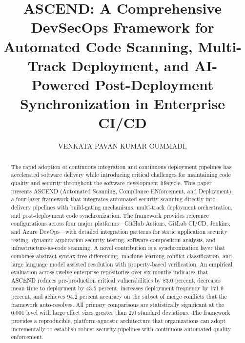 \documentclass{ieeeaccess}
\begin{document}

\title{ASCEND: A Comprehensive DevSecOps Framework for Automated Code Scanning, Multi-Track Deployment, and AI-Powered Post-Deployment Synchronization in Enterprise CI/CD}

\author{\uppercase{Venkata Pavan Kumar Gummadi},
}

\address[1]{Independent Researcher, Professional Software Engineer}




\begin{abstract}
The rapid adoption of continuous integration and continuous deployment pipelines has accelerated software delivery while introducing critical challenges for maintaining code quality and security throughout the software development lifecycle. This paper presents ASCEND (Automated Scanning, Compliance ENforcement, and Deployment), a four-layer framework that integrates automated security scanning directly into delivery pipelines with build-gating mechanisms, multi-track deployment orchestration, and post-deployment code synchronization. The framework provides reference configurations across four major platforms---GitHub Actions, GitLab CI/CD, Jenkins, and Azure DevOps---with detailed integration patterns for static application security testing, dynamic application security testing, software composition analysis, and infrastructure-as-code scanning. A novel contribution is a synchronization layer that combines abstract syntax tree differencing, machine learning conflict classification, and large language model assisted resolution with property-based verification. An empirical evaluation across twelve enterprise repositories over six months indicates that ASCEND reduces pre-production critical vulnerabilities by 83.0 percent, decreases mean time to deployment by 43.5 percent, increases deployment frequency by 171.9 percent, and achieves 94.2 percent accuracy on the subset of merge conflicts that the framework auto-resolves. All primary comparisons are statistically significant at the 0.001 level with large effect sizes greater than 2.0 standard deviations. The framework provides a reproducible, platform-agnostic architecture that organizations can adopt incrementally to establish robust security pipelines with continuous automated quality enforcement.
\end{abstract}
\end{document}

